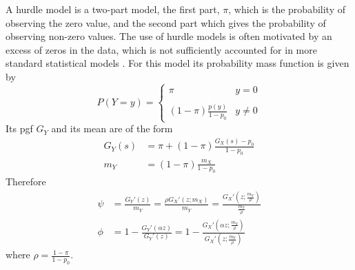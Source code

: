 \documentclass[12pt,a4paper]{article}
\theoremstyle{plain}%
\theoremstyle{definition}
\theoremstyle{remark}
\begin{document}
	A hurdle model is a two-part model, 
	the first part, $\pi$, which is the probability of observing the  zero value, and the second part which gives the probability of observing non-zero values. 
	The use of hurdle models is often motivated by an excess of zeros in the data, which is not sufficiently accounted for in more standard statistical models \cite{johnson2005univariate}. 
	For this model its probability mass function is given by
	\begin{equation*}\label{hd}
	P(Y=y)= \left\{ \begin{array}{lc}
	\pi & y=0 \\
	\\ (1-\pi)\frac{p(y)}{1-p_0}  & y\neq 0
	\end{array}
	\right.
	\end{equation*}
	Its pgf $G_Y$ and its mean are of the form
	\begin{equation*}
	\begin{split}
	G_Y(s)&=\pi+(1-\pi)\frac{G_X(s)-p_0}{1-p_0}\\
	m_Y&=(1-\pi)\frac{m_X}{1-p_0}
	\end{split}
	\end{equation*}
	Therefore
	\begin{equation}
	\begin{split}
	\psi&= \frac{G_Y'(z)}{m_Y}= \frac{\rho G_X'(z;m_X)}{ m_Y} =\frac{G_X'\left( z;\frac{m_Y}{\rho}\right) }{\frac{m_Y}{\rho}}\\
	\phi&=1-\frac{G_Y'(\alpha z)}{G_Y'(z)}=1-\frac{G_X'\left( \alpha z;\frac{m_Y}{\rho}\right) }
	{G_X'\left( z;\frac{m_Y}{\rho}\right) } 
	\end{split}
	\end{equation}
	where $\rho=\frac{1-\pi}{1-p_0}$.
	
\end{document}
